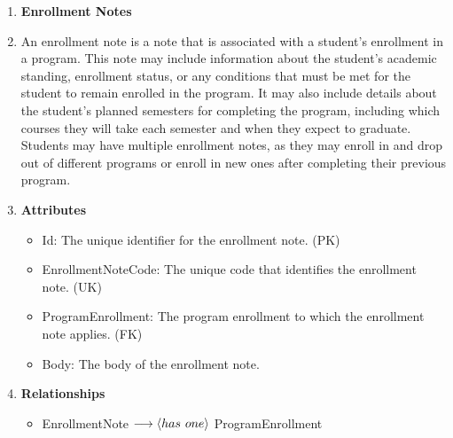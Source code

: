 \documentclass[12pt]{article}
\begin{document}
\begin{appendices}
\begin{enumerate}[label=(\roman*)]
    \item \textbf{Enrollment Notes}
    \item[] An enrollment note is a note that is associated with a student's enrollment in a program. This note may include information about the student's academic standing, enrollment status, or any conditions that must be met for the student to remain enrolled in the program. It may also include details about the student's planned semesters for completing the program, including which courses they will take each semester and when they expect to graduate. Students may have multiple enrollment notes, as they may enroll in and drop out of different programs or enroll in new ones after completing their previous program.
    \item[] \textbf{Attributes}
    \begin{itemize}
        \item Id: The unique identifier for the enrollment note. (PK)
        \item EnrollmentNoteCode: The unique code that identifies the enrollment note. (UK)
        \item ProgramEnrollment: The program enrollment to which the enrollment note applies. (FK)
        \item Body: The body of the enrollment note.
    \end{itemize}
    \item[] \textbf{Relationships}
    \begin{itemize}
        \item EnrollmentNote $ \longrightarrow \langle has \hspace{0.125cm} one \rangle $ ProgramEnrollment
    \end{itemize}


\end{enumerate}
\end{appendices}
\end{document}
